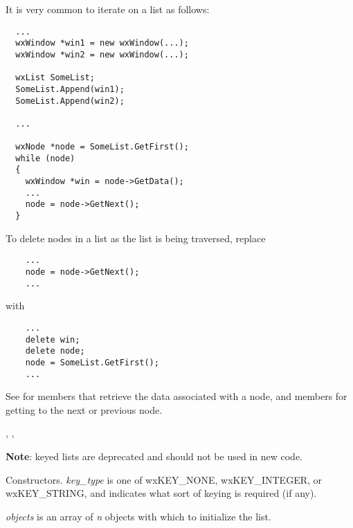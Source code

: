 
It is very common to iterate on a list as follows:

\begin{verbatim}
  ...
  wxWindow *win1 = new wxWindow(...);
  wxWindow *win2 = new wxWindow(...);

  wxList SomeList;
  SomeList.Append(win1);
  SomeList.Append(win2);

  ...

  wxNode *node = SomeList.GetFirst();
  while (node)
  {
    wxWindow *win = node->GetData();
    ...
    node = node->GetNext();
  }
\end{verbatim}

To delete nodes in a list as the list is being traversed, replace

\begin{verbatim}
    ...
    node = node->GetNext();
    ...
\end{verbatim}

with

\begin{verbatim}
    ...
    delete win;
    delete node;
    node = SomeList.GetFirst();
    ...
\end{verbatim}

See  for members that retrieve the data associated with a node, and
members for getting to the next or previous node.


, ,


\label{wxlistctor}




{\bf Note}: keyed lists are deprecated and should not be used in new code.


Constructors. {\it key\_type} is one of wxKEY\_NONE, wxKEY\_INTEGER, or wxKEY\_STRING,
and indicates what sort of keying is required (if any).

{\it objects} is an array of {\it n} objects with which to initialize the list.


